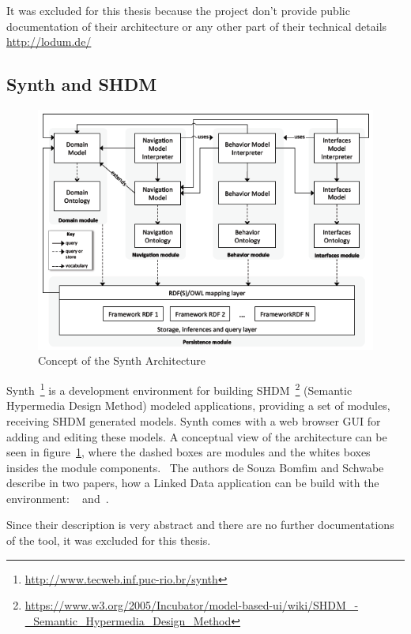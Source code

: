It was excluded for this thesis because the project don't provide public documentation of their architecture or any other part of their technical details
\url{http://lodum.de/}

\subsection{Synth and SHDM}

\begin{figure}[htbp]
	\centering
\includegraphics[width=\textwidth]{img/synth-concept.png}
	\caption{Concept of the Synth Architecture}
	\label{synth_concept}
\end{figure}

Synth~\footnote{\url{http://www.tecweb.inf.puc-rio.br/synth}} is a development environment for building SHDM~\footnote{\url{https://www.w3.org/2005/Incubator/model-based-ui/wiki/SHDM_-_Semantic_Hypermedia_Design_Method}} (Semantic Hypermedia Design Method) modeled applications, providing a set of modules, receiving SHDM generated models. Synth comes with a web browser GUI for adding and editing these models. A conceptual view of the architecture can be seen in figure~\ref{synth_concept}, where the dashed boxes are modules and the whites boxes insides the module components.~\cite{desynth} The authors de Souza Bomfim and Schwabe describe in two papers, how a Linked Data application can be build with the environment: ~\cite{desynth} and~\cite{de2011design}.

Since their description is very abstract and there are no further documentations of the tool, it was excluded for this thesis. 